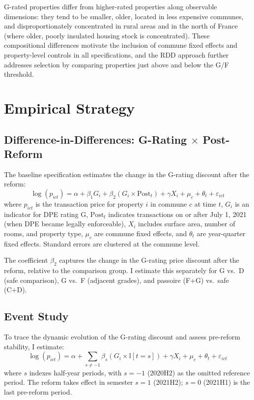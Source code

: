 \documentclass[12pt]{article}
\newcommand{\ind}{\mathbb{I}}
\begin{document}
G-rated properties differ from higher-rated properties along observable dimensions: they tend to be smaller, older, located in less expensive communes, and disproportionately concentrated in rural areas and in the north of France (where older, poorly insulated housing stock is concentrated). These compositional differences motivate the inclusion of commune fixed effects and property-level controls in all specifications, and the RDD approach further addresses selection by comparing properties just above and below the G/F threshold.


\section{Empirical Strategy}

\subsection{Difference-in-Differences: G-Rating $\times$ Post-Reform}

The baseline specification estimates the change in the G-rating discount after the reform:
\begin{equation}
\log(p_{ict}) = \alpha + \beta_1 G_i + \beta_2 (G_i \times \text{Post}_t) + \gamma X_i + \mu_c + \theta_t + \varepsilon_{ict}
\label{eq:did}
\end{equation}
where $p_{ict}$ is the transaction price for property $i$ in commune $c$ at time $t$, $G_i$ is an indicator for DPE rating G, $\text{Post}_t$ indicates transactions on or after July 1, 2021 (when DPE became legally enforceable), $X_i$ includes surface area, number of rooms, and property type, $\mu_c$ are commune fixed effects, and $\theta_t$ are year-quarter fixed effects. Standard errors are clustered at the commune level.

The coefficient $\beta_2$ captures the change in the G-rating price discount after the reform, relative to the comparison group. I estimate this separately for G vs.\ D (safe comparison), G vs.\ F (adjacent grades), and passoire (F+G) vs.\ safe (C+D).

\subsection{Event Study}

To trace the dynamic evolution of the G-rating discount and assess pre-reform stability, I estimate:
\begin{equation}
\log(p_{ict}) = \alpha + \sum_{s \neq -1} \beta_s (G_i \times \ind[t = s]) + \gamma X_i + \mu_c + \theta_t + \varepsilon_{ict}
\label{eq:event}
\end{equation}
where $s$ indexes half-year periods, with $s = -1$ (2020H2) as the omitted reference period. The reform takes effect in semester $s = 1$ (2021H2); $s = 0$ (2021H1) is the last pre-reform period.
\end{document}
